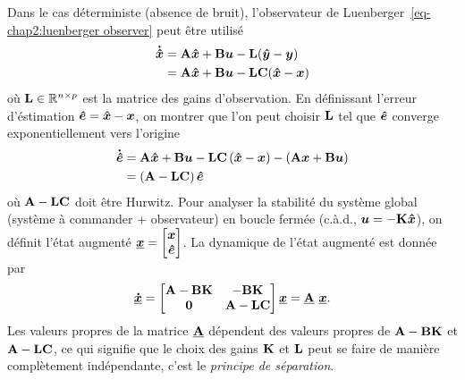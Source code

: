 Dans le cas déterministe (absence de bruit), l'observateur de Luenberger~\eqref{eq-chap2:luenberger observer} peut être utilisé
\begin{align}\label{eq-chap2:luenberger observer}
	\begin{split}
		\bm{\dot{\hat{x}}} &= \mathbf{A}\bm{\hat{x}}+\mathbf{B}\bm{u}-\mathbf{L}(\bm{\hat{y}}-\bm{y})\\
		 &=\mathbf{A}\bm{\hat{x}}+\mathbf{B}\bm{u}-\mathbf{L}\mathbf{C}(\bm{\hat{x}}-\bm{x})
	\end{split}
\end{align}
où $\mathbf{L}\in \mathbb{R}^{n\times p}$ est la matrice des gains d'observation.
En définissant l'erreur d'éstimation $\bm{\hat{e}}=\bm{\hat{x}}-\bm{x}$, on montrer que l'on peut choisir  $\mathbf{L}$ tel que $\bm{\hat{e}}$ converge exponentiellement vers l'origine 
\begin{align}
	\begin{split}
		\bm{\dot{\hat{e}}} &=  \mathbf{A}\bm{\hat{x}}+\mathbf{B}\bm{u}-\mathbf{L}\mathbf{C}\left(\bm{\hat{x}}-\bm{x}\right) - \left(\mathbf{A}\bm{x}+\mathbf{B}\bm{u}\right)\\
		&=\left(\mathbf{A}-\mathbf{L}\mathbf{C}\right)\bm{\hat{e}}
	\end{split}
\end{align}
où $\mathbf{A}-\mathbf{L}\mathbf{C}$ doit être Hurwitz. Pour analyser la stabilité du système global (système à commander + observateur) en boucle fermée (c.à.d., $\bm{u}=-\mathbf{K}\bm{\hat{x}}$), on définit l'état augmenté $\underline{\bm{x}} = \begin{bmatrix}\bm{x}\\\bm{\hat{e}}\end{bmatrix}$. La dynamique de l'état augmenté est donnée par 
\begin{equation}
	\underline{\stateDot} = \begin{bmatrix}
		\matriceA-\matriceB\matriceK & -\matriceB\matriceK \\ \zeros & \matriceA-\matriceL\matriceC
	\end{bmatrix}\underline{\state} = \underline{\matriceA}\ \underline{\state}.
\end{equation}
Les valeurs propres de  la matrice $\underline{\mathbf{A}}$ dépendent des valeurs propres de  $\mathbf{A}-\mathbf{B}\mathbf{K}$ et $\mathbf{A}-\mathbf{L}\mathbf{C}$, ce qui signifie que le choix des gains $\mathbf{K}$ et $\mathbf{L}$ peut se faire de manière complètement indépendante, c'est le \emph{principe de séparation}.

